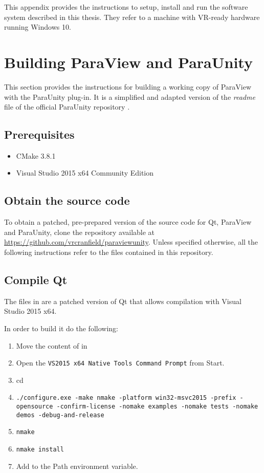 This appendix provides the instructions to setup, install and run the software system described in this thesis. They refer to a machine with VR-ready hardware running Windows 10. 

\section{Building ParaView and ParaUnity}
This section provides the instructions for building a working copy of ParaView with the ParaUnity plug-in. It is a simplified and adapted version of the \textit{readme} file of the official ParaUnity repository \cite{paraunity}.

\subsection{Prerequisites}
\begin{itemize}
	\item CMake 3.8.1
	\item Visual Studio 2015 x64 Community Edition
\end{itemize}

\subsection{Obtain the source code}
To obtain a patched, pre-prepared version of the source code for Qt, ParaView and ParaUnity, clone the repository available at \url{https://github.com/vrcranfield/paraviewunity}. Unless specified otherwise, all the following instructions refer to the files contained in this repository.

\subsection{Compile Qt}
The files in  are a patched version of Qt that allows compilation with Visual Studio 2015 x64.

In order to build it do the following:
\begin{enumerate}
	\item Move the content of  in 
	\item Open the \texttt{VS2015 x64 Native Tools Command Prompt} from Start.
	\item cd 
	\item \texttt{./configure.exe -make nmake -platform win32-msvc2015 -prefix  -opensource -confirm-license -nomake examples -nomake tests -nomake demos -debug-and-release}
	\item \texttt{nmake}
	\item \texttt{nmake install}
	\item Add  to the Path environment variable.
\end{enumerate}

